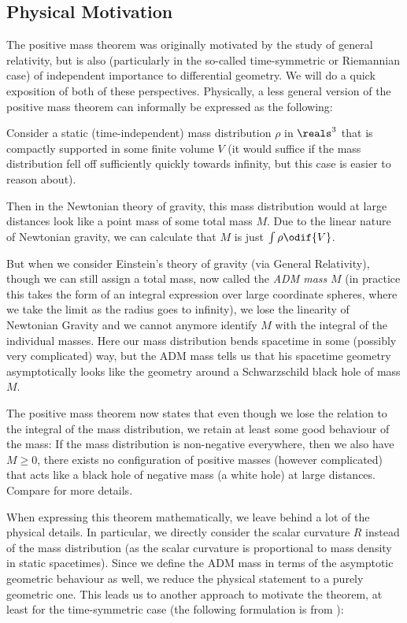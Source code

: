\documentclass[titlepage,numbers=noenddot,headinclude,oneside,%
footinclude=true,cleardoublepage=empty,%
BCOR=5mm,paper=a4,fontsize=11pt,%
english,%
]{scrartcl}
\begin{document}
\subsection{Physical Motivation}
The positive mass theorem was originally motivated by the study of general relativity, but is also (particularly in the so-called time-symmetric or Riemannian case) of independent importance to differential geometry. We will do a quick exposition of both of these perspectives. Physically, a less general version of the positive mass theorem can informally be expressed as the following: 

Consider a static (\ie time-independent) mass distribution \( \rho \) in \( \reals^3 \) that is compactly supported in some finite volume \( V \) (it would suffice if the mass distribution fell off sufficiently quickly towards infinity, but this case is easier to reason about).

Then in the Newtonian theory of gravity, this mass distribution would at large distances look like a point mass of some total mass \( M \). Due to the linear nature of Newtonian gravity, we can calculate that \( M \) is just \( \int \rho \odif{V} \).

But when we consider Einstein's theory of gravity (via General Relativity), though we can still assign a total mass, now called the \emph{ADM mass} \( M \) (in practice this takes the form of an integral expression over large coordinate spheres, where we take the limit as the radius goes to infinity), we lose the linearity of Newtonian Gravity and we cannot anymore identify \( M \) with the integral of the individual masses. Here our mass distribution bends spacetime in some (possibly very complicated) way, but the ADM mass tells us that his spacetime geometry asymptotically looks like the geometry around a Schwarzschild black hole of mass \( M \).

The positive mass theorem now states that even though we lose the relation to the integral of the mass distribution, we retain at least some good behaviour of the mass: If the mass distribution is non-negative everywhere, then we also have \( M\geq 0 \), \ie there exists no configuration of positive masses (however complicated) that acts like a black hole of negative mass (a white hole) at large distances. Compare \cite[Chapter 7]{leeGeometricRelativity2019} for more details.

When expressing this theorem mathematically, we leave behind a lot of the physical details. In particular, we directly consider the scalar curvature \( R \) instead of the mass distribution (as the scalar curvature is proportional to mass density in static spacetimes). Since we define the ADM mass in terms of the asymptotic geometric behaviour as well, we reduce the physical statement to a purely geometric one. This leads us to another approach to motivate the theorem, at least for the time-symmetric case (the following formulation is from \cite[1]{braySpacetimeHarmonicFunctions2021}):
\end{document}
